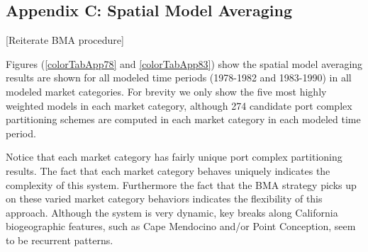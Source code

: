 \documentclass[12pt]{article}
\begin{document}
%
%
%

\subsection{Appendix C: Spatial Model Averaging}\label{appBMA}

[Reiterate BMA procedure]

Figures (\ref{colorTabApp78} and \ref{colorTabApp83}) show the spatial model 
averaging results are shown for all modeled time periods (1978-1982 and 
1983-1990) in all modeled market categories. For brevity we only show the five 
most highly weighted models in each market category, although 274 candidate 
port complex partitioning schemes are computed in each market category in each 
modeled time period.  

Notice that each market category has fairly unique port complex
partitioning results. The fact that each market category behaves
uniquely indicates the complexity of this system. Furthermore the fact
that the BMA strategy picks up on these varied market category
behaviors indicates the flexibility of this approach. Although the
system is very dynamic, key breaks along California biogeographic
features, such as Cape Mendocino and/or Point Conception, seem to be
recurrent patterns.
\end{document}
